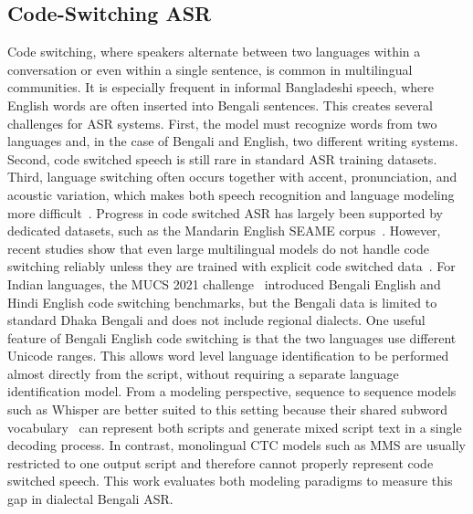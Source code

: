 \documentclass[journal]{IEEEtran}
\begin{document}
\subsection{Code-Switching ASR}
Code switching, where speakers alternate between two languages within a conversation or even within a single sentence, is common in multilingual communities. It is especially frequent in informal Bangladeshi speech, where English words are often inserted into Bengali sentences. This creates several challenges for ASR systems. First, the model must recognize words from two languages and, in the case of Bengali and English, two different writing systems. Second, code switched speech is still rare in standard ASR training datasets. Third, language switching often occurs together with accent, pronunciation, and acoustic variation, which makes both speech recognition and language modeling more difficult~\cite{yilmaz2018augmentation,sitaram2019survey}. Progress in code switched ASR has largely been supported by dedicated datasets, such as the Mandarin English SEAME corpus~\cite{lyu2010seame}. However, recent studies show that even large multilingual models do not handle code switching reliably unless they are trained with explicit code switched data~\cite{winata2021multilingual}. For Indian languages, the MUCS 2021 challenge~\cite{mucs2021} introduced Bengali English and Hindi English code switching benchmarks, but the Bengali data is limited to standard Dhaka Bengali and does not include regional dialects. One useful feature of Bengali English code switching is that the two languages use different Unicode ranges. This allows word level language identification to be performed almost directly from the script, without requiring a separate language identification model. From a modeling perspective, sequence to sequence models such as Whisper are better suited to this setting because their shared subword vocabulary~\cite{sennrich2016bpe} can represent both scripts and generate mixed script text in a single decoding process. In contrast, monolingual CTC models such as MMS are usually restricted to one output script and therefore cannot properly represent code switched speech. This work evaluates both modeling paradigms to measure this gap in dialectal Bengali ASR.
\end{document}
